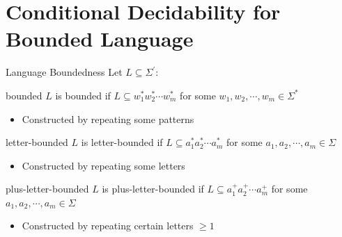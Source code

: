 \documentclass[aspectratio=169]{beamer}
\begin{document}
\section{Conditional Decidability for Bounded Language}
\begin{frame}{Language Boundedness}
    Let $L \subseteq \Sigma^\prime$:

    \begin{block}{bounded }
        $L$ is bounded if $L \subseteq w_1^*w_2^*\cdots w_m^*$ for some $w_1,w_2,\cdots, w_m \in \Sigma^*$
        \begin{itemize}
            \item Constructed by repeating some patterns
        \end{itemize}
    \end{block}


    \begin{block}{letter-bounded }
        $L$ is letter-bounded if $L \subseteq a_1^*a_2^*\cdots a_m^*$ for some $a_1,a_2,\cdots, a_m \in \Sigma$
        \begin{itemize}
            \item Constructed by repeating some letters
        \end{itemize}
    \end{block}


    \begin{block}{plus-letter-bounded }
        $L$ is plus-letter-bounded if $L \subseteq a_1^+a_2^+\cdots a_m^+$ for some $a_1,a_2,\cdots, a_m \in \Sigma$
        \begin{itemize}
            \item Constructed by repeating certain letters $\ge 1$
        \end{itemize}
    \end{block}
\end{frame}
\end{document}
